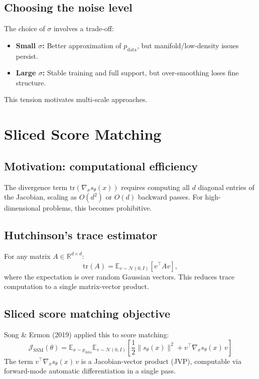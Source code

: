 \documentclass[11pt]{article}
\theoremstyle{definition}
\begin{document}
\subsection{Choosing the noise level}
The choice of $\sigma$ involves a trade-off:
\begin{itemize}
\item \textbf{Small $\sigma$:} Better approximation of $p_{\text{data}}$, but manifold/low-density issues persist.
\item \textbf{Large $\sigma$:} Stable training and full support, but over-smoothing loses fine structure.
\end{itemize}
This tension motivates multi-scale approaches.

\section{Sliced Score Matching}

\subsection{Motivation: computational efficiency}
The divergence term $\text{tr}(\nabla_x s_\theta(x))$ requires computing all $d$ diagonal entries of the Jacobian, 
scaling as $O(d^2)$ or $O(d)$ backward passes. 
For high-dimensional problems, this becomes prohibitive.

\subsection{Hutchinson's trace estimator}
For any matrix $A \in \mathbb{R}^{d \times d}$:
\begin{equation}
\text{tr}(A) = \mathbb{E}_{v \sim \mathcal{N}(0,I)}[v^\top A v],
\end{equation}
where the expectation is over random Gaussian vectors. 
This reduces trace computation to a single matrix-vector product.

\subsection{Sliced score matching objective}
Song \& Ermon (2019) applied this to score matching:
\begin{equation}
\label{eq:ssm}
\boxed{
\mathcal{J}_{\text{SSM}}(\theta)
= \mathbb{E}_{x \sim p_{\text{data}}} \mathbb{E}_{v \sim \mathcal{N}(0,I)}\left[\frac{1}{2} \|s_\theta(x)\|^2 + v^\top \nabla_x s_\theta(x) \, v\right]
}
\end{equation}
The term $v^\top \nabla_x s_\theta(x) \, v$ is a Jacobian-vector product (JVP), 
computable via forward-mode automatic differentiation in a single pass.
\end{document}
